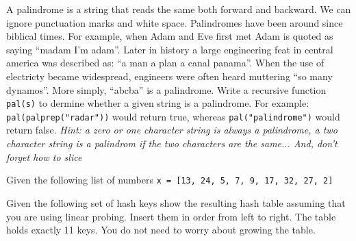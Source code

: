 \documentclass[11pt]{exam}
\begin{document}
\begin{questions}

\question[10]
A palindrome is a string that reads the same both forward and
backward. We can ignore punctuation marks and white space. Palindromes have been
 around since biblical times. For example, when Adam and Eve first met Adam is quoted as saying ``madam I'm adam''. Later in history a large engineering feat in central america was described as:
``a man a plan a canal panama''. When the use of electricty became widespread,
engineers were often heard muttering ``so many dynamos''.   More simply, ``abcba'' is a palindrome.  Write a recursive
function \texttt{pal(s)} to dermine whether a given string is a
palindrome. For example: \texttt{pal(palprep("radar"))} 
would return true, whereas \texttt{pal("palindrome")} would return false. \textit{Hint: a zero or one character string is always a palindrome, a two character string is a palindrom if the two characters are the same... And, don't forget how to slice}

\newpage
\question Given the following list of numbers \lstinline{x = [13, 24, 5, 7, 9, 17, 32, 27, 2]}


\newpage
\question[10] Given the following set of hash keys show the resulting hash table assuming that you are using linear probing.  Insert them in order from left to right.  The table holds exactly 11 keys.  You do not need to worry about growing the table.


\end{questions}
\end{document}
